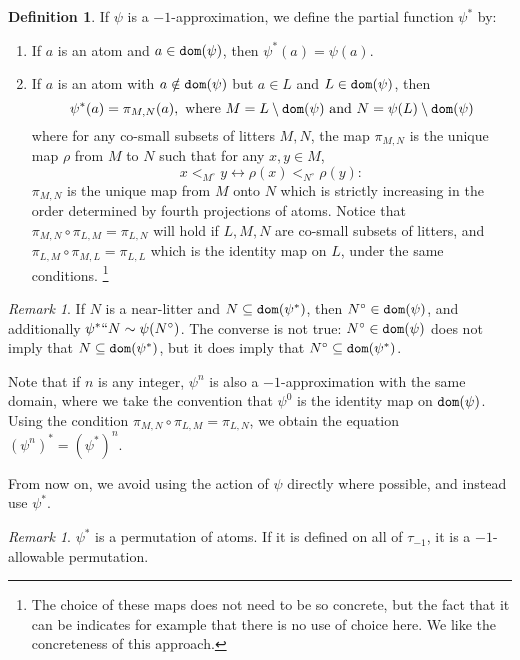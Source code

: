 \documentclass[112pt]{article}
\theoremstyle{definition}
\newtheorem{definition}[theorem]{Definition}
\theoremstyle{remark}
\newtheorem{remark}[theorem]{Remark}
\newcommand{\rk}[1]{{\color{blue}\sl #1}}
\begin{document}
\begin{definition}
  If $\psi$ is a $-1$-approximation, we define the partial function $\psi^*$ by:
  \begin{enumerate}
    \item If $a$ is an atom and $a \in {\tt dom}(\psi)$, then $\psi^*(a) = \psi(a)$.
    \item If $a$ is an atom with $a \notin {\tt dom}(\psi)$ but $a \in L$ and $L \in {\tt dom}(\psi)$, then
    $$ \psi^*(a) = \pi_{M, N}(a),\ \mathrm{where}\ M = L \setminus {\tt dom}(\psi) \ \mathrm{and}\ N = \psi(L) \setminus {\tt dom}(\psi) $$
    where for any co-small subsets of litters $M, N$, the map $\pi_{M,N}$ is the unique map $\rho$ from $M$ to $N$ such that for any $x, y \in M$,
    $$x <_{M^{\circ}} y \leftrightarrow \rho(x) <_{N^\circ} \rho(y):$$
    $\pi_{M,N}$ is the unique map from $M$ onto $N$ which is strictly increasing in the order determined by fourth projections of atoms.  Notice that $ \pi_{M,N} \circ \pi_{L,M} = \pi_{L,N}$ will hold if $L,M,N$ are co-small subsets of litters, %
and $\pi_{L,M} \circ \pi_{M,L} = \pi_{L,L}$ which is the identity map on $L$, under the same conditions.%
    \footnote{The choice of these maps does not need to be so concrete, but the fact that it can be indicates for example that there is no use of choice here.  We like the concreteness of this approach.}
  \end{enumerate}
\end{definition}
\begin{remark}
  If $N$ is a near-litter and $N \subseteq {\tt dom}(\psi^*)$, then $N^\circ \in {\tt dom}(\psi)$, and additionally $\psi^* `` N \sim \psi(N^\circ)$.
  The converse is not true: $N^\circ \in {\tt dom}(\psi)$ does not imply that $N \subseteq {\tt dom}(\psi^*)$, but it does imply that $N^\circ \subseteq {\tt dom}(\psi^*)$.

  Note that if $n$ is any integer, $\psi^n$ is also a $-1$-approximation with the same domain, where we take the convention that $\psi^0$ is the identity map on ${\tt dom}(\psi)$.
  Using the condition $\pi_{M,N} \circ \pi_{L,M} = \pi_{L,N}$, we obtain the equation $(\psi^n)^* = (\psi^*)^n$.
\end{remark}
From now on, we avoid using the action of $\psi$ directly where possible, and instead use $\psi^*$.
\begin{remark}\label{rk:minus_one_approx_allowable}
  $\psi^*$ is a permutation of atoms.
  If it is defined on all of $\tau_{-1}$, it is a $-1$-allowable permutation.
\end{remark}
\end{document}
